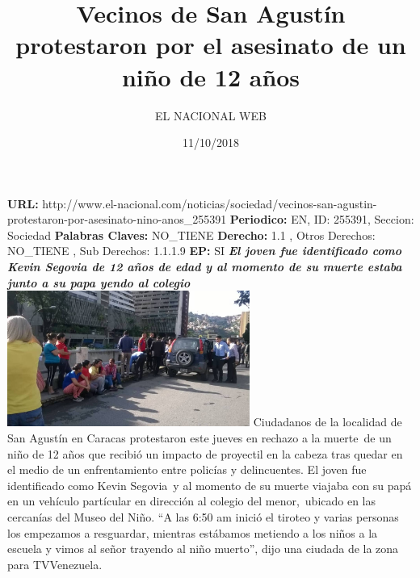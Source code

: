 \documentclass{article}%
\title{\textbf{Vecinos de San Agustín protestaron por el asesinato de un niño de 12 años}}%
\author{EL NACIONAL WEB}%
\date{11/10/2018}%
\begin{document}
%
\normalsize%
\maketitle%
\textbf{URL: }%
http://www.el{-}nacional.com/noticias/sociedad/vecinos{-}san{-}agustin{-}protestaron{-}por{-}asesinato{-}nino{-}anos\_255391\newline%
%
\textbf{Periodico: }%
EN, %
ID: %
255391, %
Seccion: %
Sociedad\newline%
%
\textbf{Palabras Claves: }%
NO\_TIENE\newline%
%
\textbf{Derecho: }%
1.1%
, Otros Derechos: %
NO\_TIENE%
, Sub Derechos: %
1.1.1.9%
\newline%
%
\textbf{EP: }%
SI\newline%
\newline%
%
\textbf{\textit{El joven fue identificado como Kevin Segovia de 12 años de edad y al momento de su muerte estaba junto a su papa yendo al colegio}}%
\newline%
\newline%
%
\includegraphics[width=300px]{8.jpg}%
\newline%
%
Ciudadanos de la localidad de San Agustín en Caracas protestaron este jueves en rechazo a la muerte~de un niño de 12 años que recibió un impacto de proyectil en la cabeza tras quedar en el medio de un enfrentamiento entre policías y delincuentes.%
\newline%
%
El joven fue identificado como Kevin Segovia~y al momento de su muerte viajaba con su papá en un vehículo partícular en dirección al colegio del menor,~ubicado en las cercanías del Museo del Niño.%
\newline%
%
“A las 6:50 am inició el tiroteo y varias personas los empezamos a resguardar, mientras estábamos metiendo a los niños a la escuela y vimos al señor trayendo al niño muerto”, dijo una ciudada de la zona para TVVenezuela.%
\newline%
%
\end{document}
